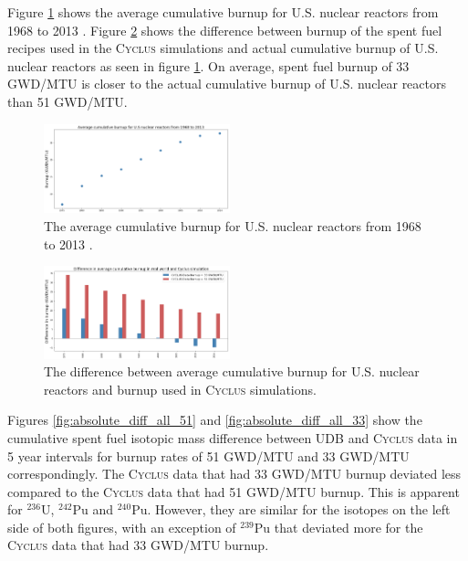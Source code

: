 \documentclass{anstrans}
\newcommand{\Cyclus}{\textsc{Cyclus}\xspace}%
\begin{document}
Figure \ref{fig:burn_up_real} shows the average cumulative burnup for U.S. 
nuclear reactors from 1968 to 2013 \cite{eia_spent_2015}. Figure 
\ref{fig:burn_up_difference} shows the difference between burnup of the spent 
fuel recipes used in the \Cyclus simulations and actual cumulative burnup of U.S. 
nuclear reactors as seen in figure \ref{fig:burn_up_real}. On average, spent 
fuel burnup of 33 GWD/MTU is closer to the actual cumulative burnup of U.S. nuclear 
reactors than 51 GWD/MTU. 

\begin{figure}[t] %
	\centering
	\includegraphics[width=0.48\textwidth]{figures/burn_up_real}
	\caption{The average cumulative burnup for U.S. nuclear reactors from 1968 to 2013 \cite{eia_spent_2015}.}
	\label{fig:burn_up_real}
\end{figure} 

\begin{figure}[t] %
	\centering
	\includegraphics[width=0.48\textwidth]{figures/burn_up_difference}
	\caption{The difference between average cumulative burnup for U.S. nuclear reactors and burnup used in \Cyclus simulations.}
	\label{fig:burn_up_difference}
\end{figure} 

Figures \ref{fig:absolute_diff_all_51} and \ref{fig:absolute_diff_all_33} show 
the cumulative spent fuel isotopic mass difference between \gls{UDB} and \Cyclus data 
in 5 year intervals for burnup rates of 51 GWD/MTU and 33 GWD/MTU correspondingly. 
The \Cyclus data that had 33 GWD/MTU burnup deviated less compared to the 
\Cyclus data that had 51 GWD/MTU burnup. This is apparent for $^{236}$U, 
$^{242}$Pu and $^{240}$Pu. However, they are similar for the isotopes on the left side 
of both figures, with an exception of $^{239}$Pu that deviated more for the \Cyclus data that 
had 33 GWD/MTU burnup. 
\end{document}
